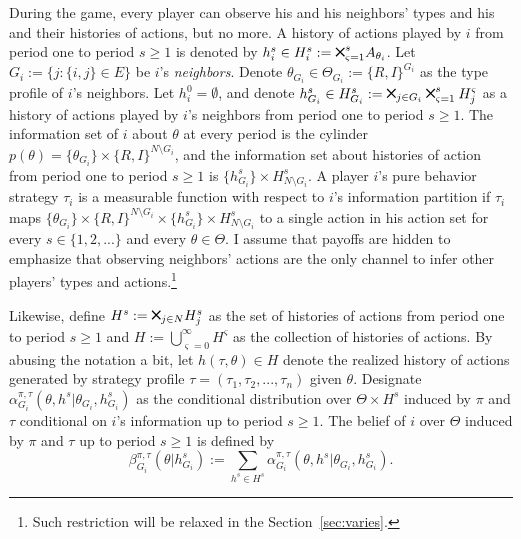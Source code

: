 \documentclass[12pt,letter]{article}
\theoremstyle{definition}
\theoremstyle{definition}
\theoremstyle{remark}
\theoremstyle{claim}
\newcommand{\bigtimes}{\mathbin{\tikz [x=1.4ex,y=1.4ex,line width=.2ex] \draw (0,0) -- (1,1) (0,1) -- (1,0);}}%
\begin{document}
During the game, every player can observe his and his neighbors' types and his and their histories of actions, but no more. A history of actions played by $i$ from period one to period $s\geq 1$ is denoted by $h^s_i\in H^s_{i}:=\bigtimes^s_{\varsigma =1} A_{\theta_i}$. Let $G_i:= \{j:\{i,j\}\in E\}$ be $i$'s \textit{neighbors}. Denote $\theta_{G_i}\in \Theta_{G_i}:= \{R,I\}^{G_i}$ as the type profile of $i$'s neighbors. Let $h^0_i=\emptyset$, and denote $h^s_{G_i}\in H^s_{G_i}:=\bigtimes_{j\in G_i}\bigtimes^s_{\varsigma =1}H^{\varsigma}_j$ as a history of actions played by $i$'s neighbors from period one to period $s\geq 1$. The information set of $i$ about $\theta$ at every period is the cylinder $p(\theta)=\{\theta_{G_i}\}\times \{R,I\}^{N\setminus G_i}$, and the information set about histories of action from period one to period $s\geq 1$ is $\{h^s_{G_i}\}\times H^s_{N\setminus G_i}$. A player $i$'s pure behavior strategy $\tau_{i}$ is a measurable function with respect to $i$'s information partition if $\tau_i$ maps $\{\theta_{G_i}\}\times \{R,I\}^{N\setminus G_i}\times \{h^s_{G_i}\}\times H^s_{N\setminus G_i}$ to a single action in his action set for every $s\in\{1,2,...\}$ and every $\theta\in \Theta$. I assume that payoffs are hidden to emphasize that observing neighbors' actions are the only channel to infer other players' types and actions.\footnote{Such restriction will be relaxed in the Section~\ref{sec:varies}.} 

Likewise, define $H^s:=\bigtimes_{j\in N} H^s_{j}$ as the set of histories of actions from period one to period $s\geq 1$ and $H:= \bigcup^{\infty}_{\varsigma=0} H^{\varsigma}$ as the collection of histories of actions. By abusing the notation a bit, let $h({\tau},\theta)\in H$ denote the realized history of actions generated by strategy profile $\tau=(\tau_1,\tau_2,...,\tau_n)$ given $\theta$. Designate $\alpha^{\pi,\tau}_{G_i}(\theta, h^{s}|\theta_{G_i},h^{s}_{G_i})$ as the conditional distribution over $\Theta\times H^s$ induced by $\pi$ and $\tau$ conditional on $i$'s information up to period $s\geq 1$. The belief of $i$ over $\Theta$ induced by $\pi$ and $\tau$ up to period $s\geq 1$ is defined by 
\[\beta^{\pi,\tau}_{G_i}(\theta|h^{s}_{G_i}):= \sum_{h^{s}\in H^s}\alpha^{\pi,\tau}_{G_i}(\theta, h^{s}|\theta_{G_i},h^{s}_{G_i}).\]
\end{document}
